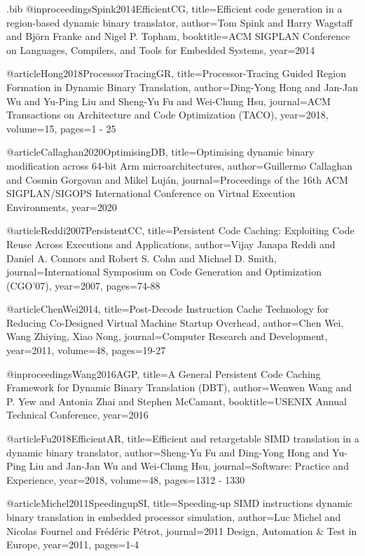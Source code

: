 \begin{filecontents}{\jobname.bib}
@inproceedings{Spink2014EfficientCG,
  title={Efficient code generation in a region-based dynamic binary translator},
  author={Tom Spink and Harry Wagstaff and Bj{\"o}rn Franke and Nigel P. Topham},
  booktitle={ACM SIGPLAN Conference on Languages, Compilers, and Tools for Embedded Systems},
  year={2014}
}

@article{Hong2018ProcessorTracingGR,
  title={Processor-Tracing Guided Region Formation in Dynamic Binary Translation},
  author={Ding-Yong Hong and Jan-Jan Wu and Yu-Ping Liu and Sheng-Yu Fu and Wei-Chung Hsu},
  journal={ACM Transactions on Architecture and Code Optimization (TACO)},
  year={2018},
  volume={15},
  pages={1 - 25}
}

@article{Callaghan2020OptimisingDB,
  title={Optimising dynamic binary modification across 64-bit Arm microarchitectures},
  author={Guillermo Callaghan and Cosmin Gorgovan and Mikel Luj{\'a}n},
  journal={Proceedings of the 16th ACM SIGPLAN/SIGOPS International Conference on Virtual Execution Environments},
  year={2020}
}

@article{Reddi2007PersistentCC,
  title={Persistent Code Caching: Exploiting Code Reuse Across Executions and Applications},
  author={Vijay Janapa Reddi and Daniel A. Connors and Robert S. Cohn and Michael D. Smith},
  journal={International Symposium on Code Generation and Optimization (CGO'07)},
  year={2007},
  pages={74-88}
}

@article{ChenWei2014,
  title={Post-Decode Instruction Cache Technology for Reducing Co-Designed Virtual Machine Startup Overhead},
  author={Chen Wei, Wang Zhiying, Xiao Nong},
  journal={Computer Research and Development},
  year={2011},
  volume={48},
  pages={19-27}
}

@inproceedings{Wang2016AGP,
  title={A General Persistent Code Caching Framework for Dynamic Binary Translation (DBT)},
  author={Wenwen Wang and P. Yew and Antonia Zhai and Stephen McCamant},
  booktitle={USENIX Annual Technical Conference},
  year={2016}
}

@article{Fu2018EfficientAR,
  title={Efficient and retargetable SIMD translation in a dynamic binary translator},
  author={Sheng-Yu Fu and Ding-Yong Hong and Yu-Ping Liu and Jan-Jan Wu and Wei-Chung Hsu},
  journal={Software: Practice and Experience},
  year={2018},
  volume={48},
  pages={1312 - 1330}
}

@article{Michel2011SpeedingupSI,
  title={Speeding-up SIMD instructions dynamic binary translation in embedded processor simulation},
  author={Luc Michel and Nicolas Fournel and Fr{\'e}d{\'e}ric P{\'e}trot},
  journal={2011 Design, Automation \& Test in Europe},
  year={2011},
  pages={1-4}
}


\end{filecontents}
